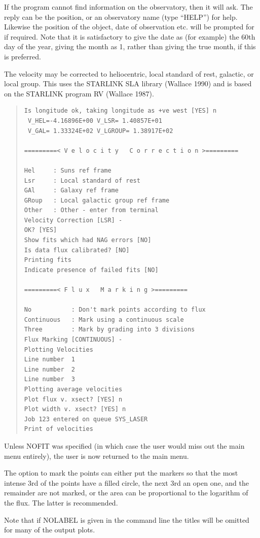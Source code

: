 If the program cannot find information on the observatory, then it will
ask.
The reply can be the position, or an observatory name (type
``HELP'') for help.
Likewise the position of the object, date of observation etc. will be
prompted for if required.
Note that it is satisfactory to give the date as (for example) the 60th
day of the year, giving the month as 1, rather than giving the true
month, if this is preferred.

The velocity may be corrected to heliocentric, local standard of rest,
galactic, or local group.
This uses the STARLINK SLA library (Wallace 1990) and is based on the
STARLINK program RV (Wallace 1987).

\begin{quote}\begin{verbatim}
Is longitude ok, taking longitude as +ve west [YES] n
 V_HEL=-4.16896E+00 V_LSR= 1.40857E+01
 V_GAL= 1.33324E+02 V_LGROUP= 1.38917E+02
 
=========< V e l o c i t y   C o r r e c t i o n >=========
 
Hel     : Suns ref frame
Lsr     : Local standard of rest
GAl     : Galaxy ref frame
GRoup   : Local galactic group ref frame
Other   : Other - enter from terminal
Velocity Correction [LSR] -
OK? [YES]
Show fits which had NAG errors [NO]
Is data flux calibrated? [NO]
Printing fits
Indicate presence of failed fits [NO]
 
=========< F l u x   M a r k i n g >=========
 
No           : Don't mark points according to flux
Continuous   : Mark using a continuous scale
Three        : Mark by grading into 3 divisions
Flux Marking [CONTINUOUS] -
Plotting Velocities
Line number  1
Line number  2
Line number  3
Plotting average velocities
Plot flux v. xsect? [YES] n
Plot width v. xsect? [YES] n
Job 123 entered on queue SYS_LASER
Print of velocities
\end{verbatim}\end{quote}

Unless NOFIT was specified (in which case the user would miss out
the main menu entirely), the user is now returned to the main menu.

The option to mark the points can either put the markers so that the
most intense 3rd of the points have a filled circle, the next 3rd an
open one, and the remainder are not marked, or the area can be
proportional to the logarithm of the flux.
The latter is recommended.

Note that if NOLABEL is given in the command line the titles will be
omitted for many of the output plots.

